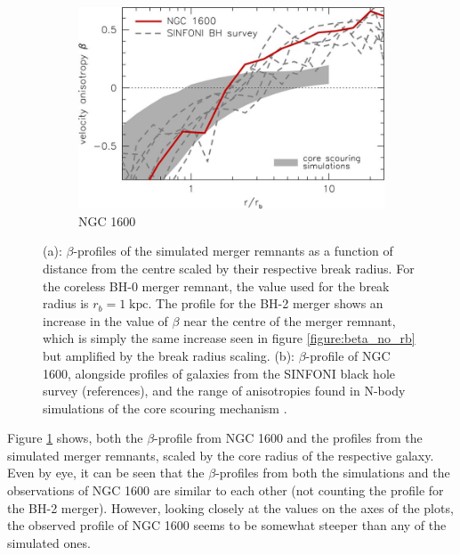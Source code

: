 \documentclass[english, oneside]{HYgradu}
\begin{document}
\begin{figure}
\begin{subfigure}[b]{0.60\textwidth}
		\includegraphics[width=\textwidth]{thomas2016.jpg}
		\caption{NGC 1600}
	\end{subfigure}
	\caption{(a): $\beta$-profiles of the simulated merger remnants as a function of distance from the centre scaled by their respective break radius. For the coreless BH-0 merger remnant, the value used for the break radius is $r_b = 1 \; \mathrm{kpc}$. The profile for the BH-2 merger shows an increase in the value of $\beta$ near the centre of the merger remnant, which is simply the same increase seen in figure \ref{figure:beta_no_rb} but amplified by the break radius scaling. (b): $\beta$-profile of NGC 1600, alongside profiles of galaxies from the SINFONI black hole survey (references), and the range of anisotropies found in N-body simulations of the core scouring mechanism \citep{Thomas2016}.}
	\label{figure:beta_NGC1600_Simul}
\end{figure}

Figure \ref{figure:beta_NGC1600_Simul} shows, both the $\beta$-profile from NGC 1600 and the profiles from the simulated merger remnants, scaled by the core radius of the respective galaxy. Even by eye, it can be seen that the $\beta$-profiles from both the simulations and the observations of NGC 1600 are similar to each other (not counting the profile for the BH-2 merger). However, looking closely at the values on the axes of the plots, the observed profile of NGC 1600 seems to be  somewhat steeper than any of the simulated ones.

\end{document}
